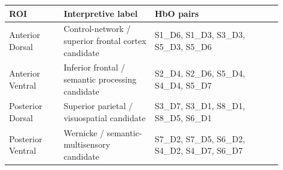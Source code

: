 \begin{tabular}{p{0.18\linewidth}p{0.30\linewidth}p{0.42\linewidth}}
\toprule
ROI & Interpretive label & HbO pairs\\
\midrule
Anterior Dorsal & Control-network / superior frontal cortex candidate & S1\_D6, S1\_D3, S3\_D3, S5\_D3, S5\_D6\\
Anterior Ventral & Inferior frontal / semantic processing candidate & S2\_D4, S2\_D6, S5\_D4, S4\_D4, S5\_D7\\
Posterior Dorsal & Superior parietal / visuospatial candidate & S3\_D7, S3\_D1, S8\_D1, S8\_D5, S6\_D1\\
Posterior Ventral & Wernicke / semantic-multisensory candidate & S7\_D2, S7\_D5, S6\_D2, S4\_D2, S4\_D7, S6\_D7\\
\bottomrule
\end{tabular}
